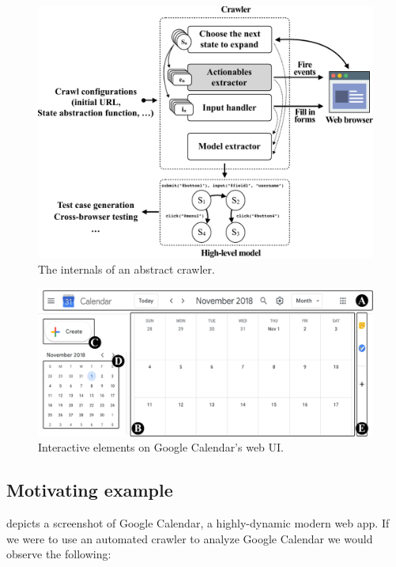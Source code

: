 \begin{figure}
	\centering
	\includegraphics[width=\linewidth]{figures/crawler-internals}
	\caption{The internals of an abstract crawler.}
	\label{fig:abstract-crawler}
\end{figure}


\begin{figure}[h]
	\centering
	\includegraphics[width=\linewidth]{figures/motivating-example}
	\caption{Interactive elements on Google Calendar's web UI.}
	\label{fig:motivating-example}
\end{figure}

\subsection{Motivating example}
\label{sec:motivating-example}

 depicts a screenshot of Google Calendar, 
a highly-dynamic modern web app.
If we were to use an automated crawler to analyze Google Calendar
we would observe the following:



